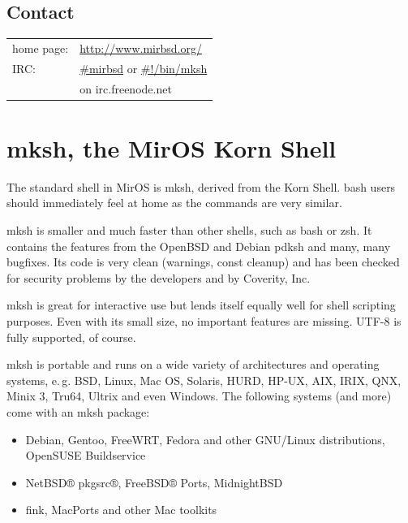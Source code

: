 \documentclass[a4paper,landscape,11pt,notumble]{leaflet}
\begin{document}
\subsection{Contact}
{\noindent\large
\begin{tabular}{ll}
home page: & \textcolor{darkred}{\url{http://www.mirbsd.org/}}\\
IRC: & \textcolor{darkred}{\url{#mirbsd}} or \textcolor{darkred}{\url{#!/bin/mksh}}\\
& on irc.freenode.net\\
\end{tabular}
\par}
\vspace{3ex}%
\graybox

\newpage

\section{mksh, the MirOS Korn Shell}

The standard shell in MirOS is mksh, derived from the Korn Shell. bash users should immediately feel at home as the commands are very similar.

mksh is smaller and much faster than other shells, such as bash or zsh. It contains the features from the OpenBSD and Debian pdksh and many, many bugfixes. Its code is very clean (warnings, const cleanup) and has been checked for security problems by the developers and by Coverity, Inc.

mksh is great for interactive use but lends itself equally well for shell scripting purposes. Even with its small size, no important features are missing. UTF-8 is fully supported, of course.

mksh is portable and runs on a wide variety of architectures and operating systems, e.\,g. BSD, Linux, Mac OS, Solaris, HURD, HP-UX, AIX, IRIX, QNX, Minix 3, Tru64, Ultrix and even Windows. The following systems (and more) come with an mksh package:

\begin{itemize}
\item Debian, Gentoo, FreeWRT, Fedora and other GNU/Linux distributions, OpenSUSE Buildservice
\item NetBSD® pkgsrc®, FreeBSD® Ports, MidnightBSD
\item fink, MacPorts and other Mac toolkits
\end{itemize}
\end{document}
